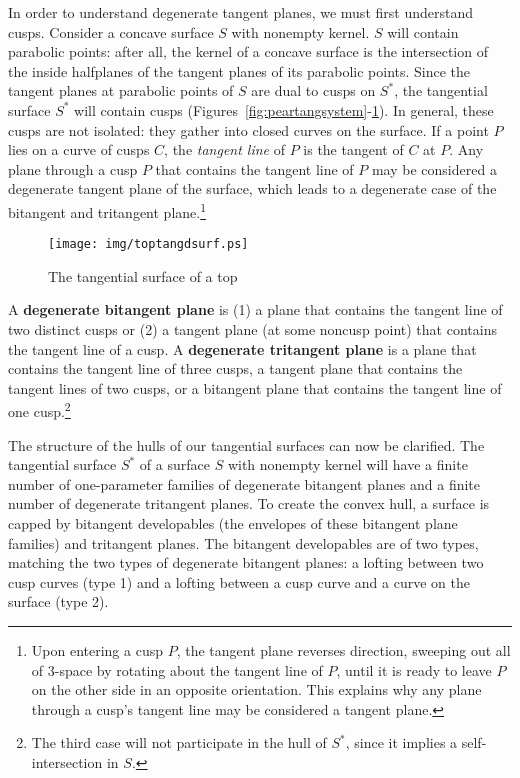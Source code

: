 \documentclass[doublespacing]{elsart}
\begin{document}
In order to understand degenerate tangent planes, we must first understand cusps.
Consider a concave
surface $S$ with nonempty kernel.
$S$ will contain parabolic points:
after all, the kernel of a concave surface is the intersection of the inside
halfplanes of the tangent planes of its parabolic points.
Since the tangent planes at parabolic points of $S$ are dual to cusps on $S^*$,
the tangential surface $S^*$ will contain cusps 
(Figures~\ref{fig:peartangsystem}-\ref{fig:toptangdsurf}).
In general, these cusps are not isolated: they gather into closed curves on the surface.
If a point $P$ lies on a curve of cusps $C$,
the {\em tangent line} of $P$ is the tangent of $C$ at $P$.
Any plane through a cusp $P$ that contains the tangent line of $P$ may be considered
a degenerate tangent plane of the surface,
which leads to a degenerate case of the bitangent and tritangent plane.\footnote{Upon entering a cusp $P$, 
	the tangent plane reverses direction, sweeping out all of 3-space 
	by rotating about the tangent line of $P$,
	until it is ready to leave $P$ on the other side in an opposite orientation.
        This explains why any plane through a cusp's tangent line may be considered a tangent plane.}

\begin{figure}
\begin{center}
\texttt{[image: img/toptangdsurf.ps]}
\end{center}
\caption{The tangential surface of a top}
\label{fig:toptangdsurf}
\end{figure}

\begin{defn2}
A {\bf degenerate bitangent plane} is 
(1) a plane that contains the tangent line of two distinct cusps or
(2) a tangent plane (at some noncusp point) that contains the tangent line of a cusp. 
A {\bf degenerate tritangent plane} is 
a plane that contains the tangent line of three cusps, 
a tangent plane that contains the tangent lines of two cusps,
or a bitangent plane that contains the tangent line of one cusp.\footnote{The
	third case will not participate in the hull of $S^*$, since
	it implies a self-intersection in $S$.}
\end{defn2}

The structure of the hulls of our tangential surfaces can now be clarified.
The tangential surface $S^*$ of a surface $S$ with nonempty kernel 
will have a finite number of one-parameter families of degenerate bitangent planes
and a finite number of degenerate tritangent planes.
To create the convex hull, a surface is capped by bitangent developables
(the envelopes of these bitangent plane families) and tritangent planes.
The bitangent developables
are of two types, matching the two types of degenerate bitangent planes: 
a lofting between two cusp curves (type 1) and
a lofting between a cusp curve and a curve on the surface (type 2).
\end{document}
